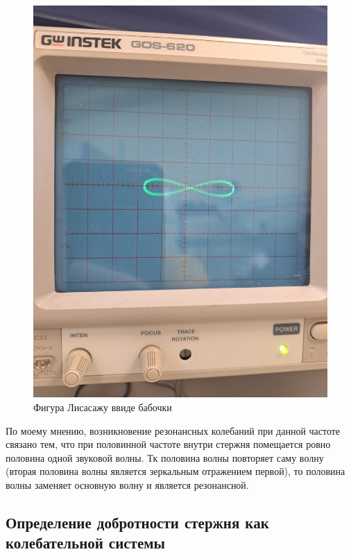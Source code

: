 \documentclass[a4paper]{article}
\begin{document}
\begin{figure}[!ht]
    \centering
    \includegraphics[scale=0.15]{Бабочка.jpg}
    \caption{Фигура Лисасажу ввиде бабочки}
\end{figure}
\item
\item По моему мнению, возникновение резонансных колебаний при данной частоте связано тем, что при половинной частоте внутри стержня помещается ровно половина одной звуковой волны. Тк половина волны повторяет саму волну (вторая половина волны является зеркальным отражением первой), то половина волны заменяет основную волну и является резонансной.

\newpage

\subsection{Определение добротности стержня как колебательной системы}
\end{document}
